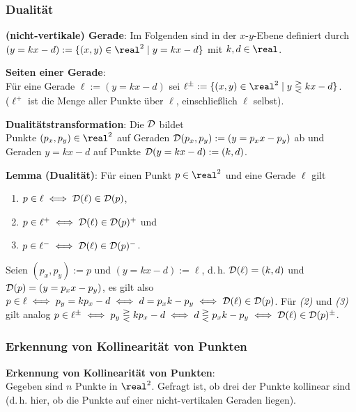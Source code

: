 \subsubsection{%
    Dualität%
}

\textbf{(nicht-vertikale) Gerade}:
Im Folgenden sind  in der $x$-$y$-Ebene definiert durch
$(y = kx - d) := \{(x, y) \in \real^2 \;|\; y = kx - d\}$ mit $k, d \in \real$.

\textbf{Seiten einer Gerade}:\\
Für eine Gerade $\ell := (y = kx - d)$ sei
$\ell^{\pm} := \{(x, y) \in \real^2 \;|\; y \gtreqless kx - d\}$.\\
($\ell^+$ ist die Menge aller Punkte über $\ell$, einschließlich $\ell$ selbst).

\textbf{Dualitätstransformation}:
Die  $\mathcal{D}$ bildet\\
Punkte $(p_x, p_y) \in \real^2$ auf Geraden $\mathcal{D}(p_x, p_y) := (y = p_x x - p_y)$ ab und\\
Geraden $y = kx - d$ auf Punkte $\mathcal{D}(y = kx - d) := (k, d)$.

\textbf{Lemma (Dualität)}:
Für einen Punkt $p \in \real^2$ und eine Gerade $\ell$ gilt
\begin{enumerate}
    \item
    $p \in \ell \iff \mathcal{D}(\ell) \in \mathcal{D}(p)$,
    
    \item
    $p \in \ell^+ \iff \mathcal{D}(\ell) \in \mathcal{D}(p)^+$ und
    
    \item
    $p \in \ell^- \iff \mathcal{D}(\ell) \in \mathcal{D}(p)^-$.
\end{enumerate}

\begin{Beweis}
    Seien $(p_x, p_y) := p$ und $(y = kx - d) := \ell$, d.\,h.
    $\mathcal{D}(\ell) = (k, d)$ und $\mathcal{D}(p) = (y = p_x x - p_y)$,
    es gilt also $p \in \ell \iff p_y = kp_x - d \iff d = p_x k - p_y \iff \mathcal{D}(\ell) \in \mathcal{D}(p)$.
    Für \emph{(2)} und \emph{(3)} gilt analog
    $p \in \ell^\pm \iff p_y \gtreqless kp_x - d \iff
    d \gtreqless p_x k - p_y \iff \mathcal{D}(\ell) \in \mathcal{D}(p)^\pm$.
\end{Beweis}

\subsubsection{%
    Erkennung von Kollinearität von Punkten%
}

\textbf{Erkennung von Kollinearität von Punkten}:\\
Gegeben sind $n$ Punkte in $\real^2$.
Gefragt ist, ob drei der Punkte kollinear sind\\
(d.\,h. hier, ob die Punkte auf einer nicht-vertikalen Geraden liegen).

